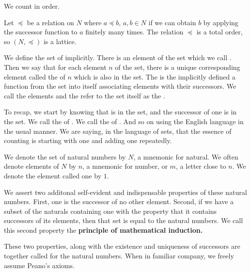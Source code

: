 

We count in order.


Let $\preceq$ be a relation
on $N$ where $a \preceq b$,
$a, b \in N$ if we can obtain
$b$ by applying the successor
function to $a$ finitely many
times.
The relation $\preceq$ is a
total order, so $(N, \preceq)$
is a lattice.


We define the set of 
implicitly.
There is an element of the set which we call
.
Then we say that for each element $n$ of the set,
there is a unique corresponding element called the
 of $n$ which is
also in the set.
The 
is the implicitly defined a function from the set
into itself associating elements with their successors.
We call the elements  and the refer
to the set itself as the .

To recap, we start by knowing that  is
in the set, and the successor of one is in the set.
We call the  of
 .
We call the  of
 .
And so on using the English language in the usual manner.
We are saying, in the language of sets, that the essence
of counting is starting with one and adding one repeatedly.


We denote the set of natural numbers by $N$, a mnemonic for natural.
We often denote elements of $N$ by $n$, a mnemonic for number, or $m$, a letter close to $n$.
We denote the element called one by $1$.


We assert two additonal self-evident and indispensable properties of these natural numbers.
First, one is the successor of no other element.
Second, if we have a subset of the naturals containing one with the property that it contains successors of its elements, then that set is equal to the natural numbers.
We call this second property the \textbf{principle of mathematical induction.}

These two properties, along with the existence
and uniqueness of successors are together called
 for the natural numbers.
When in familiar company, we freely assume Peano's axioms.

